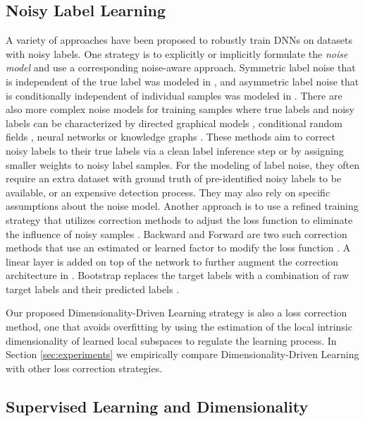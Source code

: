 \documentclass{article}
\begin{document}
\subsection{Noisy Label Learning}
A variety of approaches have been proposed to robustly train DNNs on datasets with noisy labels. One strategy is to explicitly or implicitly formulate the {\em noise model} and use a corresponding noise-aware approach. Symmetric label noise that is independent of the true label was modeled in \cite{larsen1998design}, and asymmetric label noise that is conditionally independent of individual samples was modeled in \cite{natarajan2013learning,sukhbaatar2014training}. There are also more complex noise models for training samples where true labels and noisy labels can be characterized by directed graphical models \cite{xiao2015learning}, conditional random fields \cite{vahdat2017toward}, neural networks \cite{veit2017learning,jiang2017mentornet} or knowledge graphs \cite{li2017learning}. These methods aim to correct noisy labels to their true labels via a clean label inference step or by assigning smaller weights to noisy label samples. For the modeling of label noise, they often require an extra dataset with ground truth of pre-identified noisy labels to be available, or an expensive detection process. They may also rely on specific assumptions about the noise model. %
Another approach is to use a refined training strategy that utilizes correction methods to adjust the loss function to eliminate the influence of noisy samples \citep{Wang_2018_CVPR}. Backward and Forward are two such correction methods that use an estimated or learned factor to modify the loss function \cite{patrini2017making}. A linear layer is added on top of the network to further augment the correction architecture in \cite{sukhbaatar2014learning,goldberger2016training}.  Bootstrap replaces the target labels with a combination of raw target labels and their predicted labels \cite{reed2014training}. 

Our proposed Dimensionality-Driven Learning strategy is also a loss correction method, one that avoids overfitting by using the estimation of the local intrinsic dimensionality of learned local subspaces to regulate the learning process. 
In Section \ref{sec:experiments} we empirically compare Dimensionality-Driven Learning with other loss correction strategies.

\subsection{Supervised Learning and Dimensionality}
\end{document}
